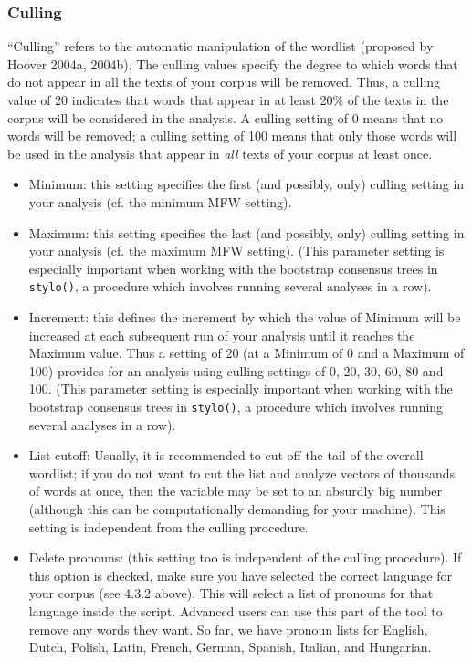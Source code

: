 \documentclass[11pt,a4paper]{article}
\def\margin#1{\marginpar{\textcolor{blue}{\footnotesize\tt #1}}}
\def\code#1{{\tt #1}}
\begin{document}
\subsubsection{Culling}

``Culling'' refers to the automatic manipulation of the wordlist (proposed
by Hoover 2004a, 2004b). The culling values specify the degree to
which words that do not appear in all the texts of your corpus will
be removed. Thus, a culling value of 20 indicates that words that
appear in at least 20\% of the texts in the corpus will be considered
in the analysis. A culling setting of 0 means that no words will be
removed; a culling setting of 100 means that only those words will
be used in the analysis that appear in \emph{all} texts of your corpus 
at least once.

\begin{itemize}
\item Minimum: this setting specifies the first (and possibly, only) culling
setting in your analysis (cf. the minimum MFW setting).\margin{culling.min=}\margin{<integer>} 

\item Maximum: this setting specifies the last (and possibly, only) culling
setting in your analysis (cf. the maximum MFW setting)\margin{culling.max=}\margin{<integer>}.
(This parameter setting is especially important when working with
the bootstrap consensus trees in \code{stylo()}, a procedure which
involves running several analyses in a row). 

\item Increment: this defines the increment by which the value of Minimum
will be increased at each subsequent run of your analysis until it
reaches the Maximum value. Thus a setting of 20 (at a Minimum of 0
and a Maximum of 100) provides for an analysis using culling settings
of 0, 20, 30, 60, 80 and 100\margin{culling.incr=}\margin{<integer>}.
(This parameter setting is especially important when working with
the bootstrap consensus trees in \code{stylo()}, a procedure which
involves running several analyses in a row). 

\item List cutoff: Usually, it is recommended to cut off the tail of the
overall wordlist\margin{mfw.list.cutoff=}\margin{<integer>};
if you do not want to cut the list and analyze vectors of thousands
of words at once, then the variable may be set to an absurdly big
number (although this can be computationally demanding for your machine).
This setting is independent from the culling procedure. 

\item Delete pronouns: (this setting too is independent of the culling 
procedure).\margin{delete.pronouns=}\margin{TRUE|FALSE}
If this option is checked, make sure you have selected the correct
language for your corpus (see 4.3.2 above). This will select a list
of pronouns for that language inside the 
script.\margin{corpus.lang=}\margin{"English"}\margin{"Dutch"}\margin{...}
Advanced users can use this part of the tool to remove any words they
want. So far, we have pronoun lists for English, Dutch, Polish, Latin,
French, German, Spanish, Italian, and Hungarian. 
\end{itemize}
\end{document}

